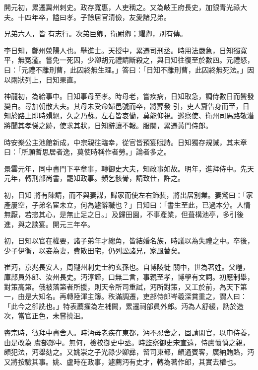 \begin{pinyinscope}
 開元初，累遷冀州刺史。政存寬惠，人吏稱之。又為岐王府長史，加銀青光祿大夫。十四年卒，謚曰孝。子餘居官清儉，友愛諸兄弟。



 兄弟六人，皆
 有志行。次弟巨卿，衛尉卿；耀卿，別有傳。



 李日知，鄭州滎陽人也。舉進士。天授中，累遷司刑丞。時用法嚴急，日知獨寬平，無冤濫。嘗免一死囚，少卿胡元禮請斷殺之，與日知往復至於數四。元禮怒，曰：「元禮不離刑曹，此囚終無生理。」答曰：「日知不離刑曹，此囚終無死法。」因以兩狀列上，日知果直。



 神龍初，為給事中。日知事母至孝。時母老，嘗疾病，日知取急，調侍數日而鬢發變白。尋加朝散大夫。其母未受命婦邑號而卒，將葬發
 引，吏人齎告身而至，日知於路上即時殞絕，久之乃蘇。左右皆哀慟，莫能仰視。巡察使、衛州司馬路敬潛將聞其孝悌之跡，使求其狀，日知辭讓不報。服闋，累遷黃門侍郎。



 時安樂公主池館新成，中宗親往臨幸，從官皆預宴賦詩。日知獨存規誡，其末章曰：「所願暫思居者逸，莫使時稱作者勞。」論者多之。



 景雲元年，同中書門下平章事，轉御史大夫，知政事如故。明年，進拜侍中。先天元年，轉刑部尚書，罷知政事。頻乞骸骨，請致仕，許之。



 初，日知
 將有陳請，而不與妻謀，歸家而使左右飾裝，將出居別業。妻驚曰：「家產屢空，子弟名宦未立，何為遽辭職也？」日知曰：「書生至此，已過本分。人情無厭，若恣其心，是無止足之日。」及歸田園，不事產業，但葺構池亭，多引後進，與之談宴。開元三年卒。



 初，日知以官在權要，諸子弟年才總角，皆結婚名族，時議以為失禮之中。卒後，少子伊衡，以妾為妻，費散田宅，仍列訟諸兄，家風替矣。



 崔沔，京兆長安人，周隴州刺史士約玄孫也。自博陵徙
 關中，世為著姓。父皚，庫部員外郎、汝州長史。沔淳謹，口無二言，事親至孝，博學有文詞。初應制舉，對策高第。俄被落第者所援，則天令所司重試，沔所對策，又工於前，為天下第一，由是大知名。再轉陸渾主簿。秩滿調遷，吏部侍郎岑羲深賞重之，謂人曰：「此今之卻詵也。」特表薦擢為左補闕，累遷祠部員外郎。沔為人舒緩，訥於造次，當官正色，未嘗撓沮。



 睿宗時，徵拜中書舍人。時沔母老疾在東都，沔不忍舍之，固請閑官，以申侍養，由是改為
 虞部郎中。無何，檢校御史中丞。時監察御史宋宣遠，恃盧懷慎之親，頗犯法，沔舉劾之。又姚崇之子光祿少卿彞，留司東都，頗通賓客，廣納賄賂，沔又將按驗其事。姚、盧時在政事，遽薦沔有史才，轉為著作郎，其實去權也。




\end{pinyinscope}
